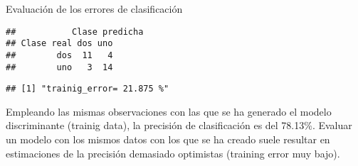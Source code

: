 \documentclass[ignorenonframetext,]{beamer}
\newenvironment{Shaded}{\begin{snugshade}}{\end{snugshade}}
\newcommand{\KeywordTok}[1]{\textcolor[rgb]{0.13,0.29,0.53}{\textbf{#1}}}
\newcommand{\DataTypeTok}[1]{\textcolor[rgb]{0.13,0.29,0.53}{#1}}
\newcommand{\DecValTok}[1]{\textcolor[rgb]{0.00,0.00,0.81}{#1}}
\newcommand{\StringTok}[1]{\textcolor[rgb]{0.31,0.60,0.02}{#1}}
\newcommand{\OperatorTok}[1]{\textcolor[rgb]{0.81,0.36,0.00}{\textbf{#1}}}
\newcommand{\NormalTok}[1]{#1}
\begin{document}
\begin{frame}[fragile]{Evaluación de los errores de clasificación}

\hypertarget{left}{}
\begin{verbatim}
##           Clase predicha
## Clase real dos uno
##        dos  11   4
##        uno   3  14
\end{verbatim}

\begin{verbatim}
## [1] "trainig_error= 21.875 %"
\end{verbatim}

Empleando las mismas observaciones con las que se ha generado el modelo
discriminante (trainig data), la precisión de clasificación es del
78.13\%. Evaluar un modelo con los mismos datos con los que se ha creado
suele resultar en estimaciones de la precisión demasiado optimistas
(training error muy bajo).

\hypertarget{right}{}
\begin{Shaded}
\end{Shaded}

\end{frame}
\end{document}
